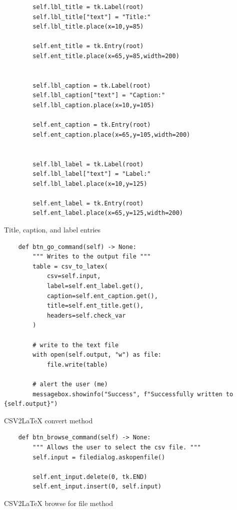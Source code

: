 \documentclass[11pt]{article}
\begin{document}
        \newpage
        \begin{listing}[!h]
            \begin{verbatim}
        self.lbl_title = tk.Label(root)
        self.lbl_title["text"] = "Title:"
        self.lbl_title.place(x=10,y=85)
        
        self.ent_title = tk.Entry(root)
        self.ent_title.place(x=65,y=85,width=200)
        
        
        self.lbl_caption = tk.Label(root)
        self.lbl_caption["text"] = "Caption:"
        self.lbl_caption.place(x=10,y=105)
        
        self.ent_caption = tk.Entry(root)
        self.ent_caption.place(x=65,y=105,width=200)
        
        
        self.lbl_label = tk.Label(root)
        self.lbl_label["text"] = "Label:"
        self.lbl_label.place(x=10,y=125)
        
        self.ent_label = tk.Entry(root)
        self.ent_label.place(x=65,y=125,width=200)
            \end{verbatim}
            \caption{Title, caption, and label entries}
            \label{sc:csv2latex-gui-init-3}
        \end{listing}

        \newpage
        \begin{listing}[!h]
            \begin{verbatim}
    def btn_go_command(self) -> None:
        """ Writes to the output file """
        table = csv_to_latex(
            csv=self.input,
            label=self.ent_label.get(),
            caption=self.ent_caption.get(),
            title=self.ent_title.get(),
            headers=self.check_var
        )
        
        # write to the text file
        with open(self.output, "w") as file:
            file.write(table)
            
        # alert the user (me)
        messagebox.showinfo("Success", f"Successfully written to {self.output}")
            \end{verbatim}
            \caption{CSV2LaTeX convert method}
            \label{sc:csv2latex-convert-method}
        \end{listing}

        \newpage
        \begin{listing}[!h]
            \begin{verbatim}
    def btn_browse_command(self) -> None:
        """ Allows the user to select the csv file. """
        self.input = filedialog.askopenfile()

        self.ent_input.delete(0, tk.END)
        self.ent_input.insert(0, self.input)
            \end{verbatim}
            \caption{CSV2LaTeX browse for file method}
            \label{sc:csv2latex-browse-method}
        \end{listing}
\end{document}
